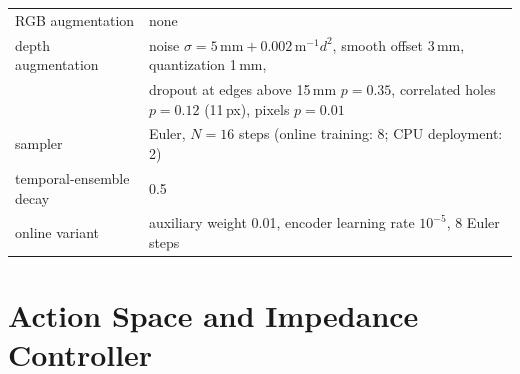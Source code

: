 \begin{table}[!htbp]
\begin{tabularx}{\textwidth}{lY}
        RGB augmentation & none \\
        depth augmentation & noise $\sigma=5\,\mathrm{mm}+0.002\,\mathrm{m}^{-1}d^{2}$, smooth offset 3\,mm, quantization 1\,mm, \\
         & dropout at edges above 15\,mm $p=0.35$, correlated holes $p=0.12$ (11\,px), pixels $p=0.01$ \\
        sampler & Euler, $N=16$ steps (online training: 8; CPU deployment: 2) \\
        temporal-ensemble decay & 0.5 \\
        online variant & auxiliary weight 0.01, encoder learning rate $10^{-5}$, 8 Euler steps \\
        \bottomrule
    \end{tabularx}
\end{table}%

\section{Action Space and Impedance Controller}\label{sec:action-contract}

